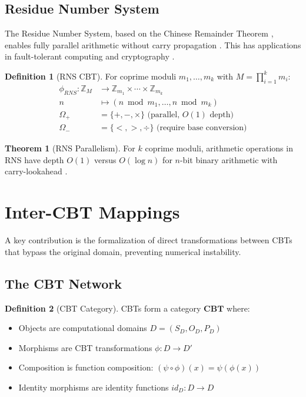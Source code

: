 \documentclass[12pt,a4paper]{article}
\theoremstyle{definition}
\newtheorem{definition}{Definition}
\newtheorem{theorem}{Theorem}
\begin{document}
\subsection{Residue Number System}

The Residue Number System, based on the Chinese Remainder Theorem \cite{sunzi500}, enables fully parallel arithmetic without carry propagation \cite{szabo1967residue}. This has applications in fault-tolerant computing \cite{watson1967self} and cryptography \cite{bajard1998rns}.

\begin{definition}[RNS CBT]
For coprime moduli $m_1, \ldots, m_k$ with $M = \prod_{i=1}^k m_i$:
\begin{align}
\phi_{RNS}: \mathbb{Z}_M &\to \mathbb{Z}_{m_1} \times \cdots \times \mathbb{Z}_{m_k} \\
n &\mapsto (n \bmod m_1, \ldots, n \bmod m_k) \\
\Omega_+ &= \{+, -, \times\} \text{ (parallel, } O(1) \text{ depth)} \\
\Omega_- &= \{<, >, \div\} \text{ (require base conversion)}
\end{align}
\end{definition}

\begin{theorem}[RNS Parallelism]
For $k$ coprime moduli, arithmetic operations in RNS have depth $O(1)$ versus $O(\log n)$ for $n$-bit binary arithmetic with carry-lookahead \cite{koren2002computer}.
\end{theorem}

\section{Inter-CBT Mappings}

A key contribution is the formalization of direct transformations between CBTs that bypass the original domain, preventing numerical instability.

\subsection{The CBT Network}

\begin{definition}[CBT Category]
CBTs form a category $\mathbf{CBT}$ where:
\begin{itemize}
\item Objects are computational domains $D = (S_D, O_D, P_D)$
\item Morphisms are CBT transformations $\phi: D \to D'$
\item Composition is function composition: $(\psi \circ \phi)(x) = \psi(\phi(x))$
\item Identity morphisms are identity functions $id_D: D \to D$
\end{itemize}
\end{definition}
\end{document}
